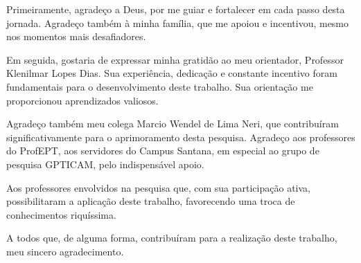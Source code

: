 \begin{agradecimentos}

Primeiramente, agradeço a Deus, por me guiar e fortalecer em cada passo desta jornada. Agradeço também à minha família, que me apoiou e incentivou, mesmo nos momentos mais desafiadores.

Em seguida, gostaria de expressar minha gratidão ao meu orientador, Professor Klenilmar Lopes Dias. Sua experiência, dedicação e constante incentivo foram fundamentais para o desenvolvimento deste trabalho. Sua orientação me proporcionou aprendizados valiosos.

Agradeço também meu colega Marcio Wendel de Lima Neri, que contribuíram significativamente para o aprimoramento desta pesquisa. Agradeço aos professores do ProfEPT, aos servidores do Campus Santana, em especial ao grupo de pesquisa GPTICAM, pelo indispensável apoio.

Aos professores envolvidos na pesquisa que, com sua participação ativa, possibilitaram a aplicação deste trabalho, favorecendo uma troca de conhecimentos riquíssima.

A todos que, de alguma forma, contribuíram para a realização deste trabalho, meu sincero agradecimento.

\end{agradecimentos}